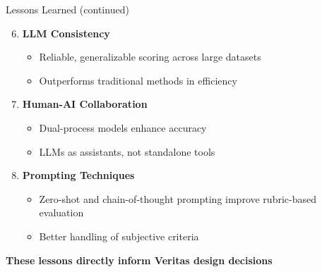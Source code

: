 \begin{frame}{Lessons Learned (continued)}
    \begin{enumerate}
        \setcounter{enumi}{5}
        \item \textbf{LLM Consistency}
        \begin{itemize}
            \item Reliable, generalizable scoring across large datasets
            \item Outperforms traditional methods in efficiency
        \end{itemize}
        
        \item \textbf{Human-AI Collaboration}
        \begin{itemize}
            \item Dual-process models enhance accuracy
            \item LLMs as assistants, not standalone tools
        \end{itemize}
        
        \item \textbf{Prompting Techniques}
        \begin{itemize}
            \item Zero-shot and chain-of-thought prompting improve rubric-based evaluation
            \item Better handling of subjective criteria
        \end{itemize}
    \end{enumerate}
    
    \vspace{0.5cm}
    \begin{center}
        \textbf{These lessons directly inform Veritas design decisions}
    \end{center}
\end{frame}
